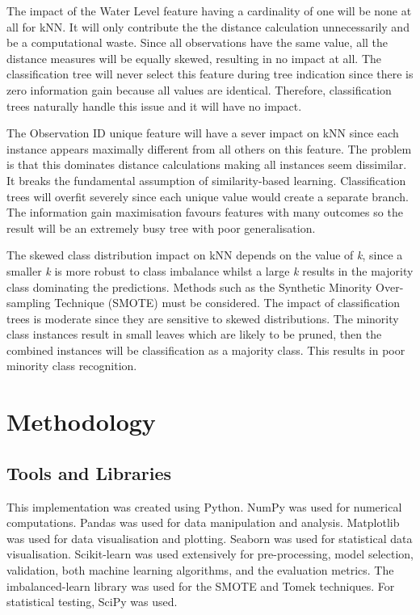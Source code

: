 \documentclass[10pt, conference]{IEEEtran}
\begin{document}
The impact of the Water Level feature having a cardinality of one will be none at all for kNN. It will only contribute the the distance calculation unnecessarily and be a computational waste. Since all observations have the same value, all the distance measures will be equally skewed, resulting in no impact at all. The classification tree will never select this feature during tree indication since there is zero information gain because all values are identical. Therefore, classification trees naturally handle this issue and it will have no impact.

The Observation ID unique feature will have a sever impact on kNN since each instance appears maximally different from all others on this feature. The problem is that this dominates distance calculations making all instances seem dissimilar. It breaks the fundamental assumption of similarity-based learning. Classification trees will overfit severely since each unique value would create a separate branch. The information gain maximisation favours features with many outcomes so the result will be an extremely busy tree with poor generalisation.

The skewed class distribution impact on kNN depends on the value of \textit{k}, since a smaller \textit{k} is more robust to class imbalance whilst a large \textit{k} results in the majority class dominating the predictions. Methods such as the Synthetic Minority Over-sampling Technique (SMOTE) must be considered. The impact of classification trees is moderate since they are sensitive to skewed distributions. The minority class instances result in small leaves which are likely to be pruned, then the combined instances will be classification as a majority class. This results in poor minority class recognition.

\section{Methodology}
\subsection{Tools and Libraries}
This implementation was created using Python. NumPy was used for numerical computations. Pandas was used for data manipulation and analysis. Matplotlib was used for data visualisation and plotting. Seaborn was used for statistical data visualisation. Scikit-learn was used extensively for pre-processing, model selection, validation, both machine learning algorithms, and the evaluation metrics. The imbalanced-learn library was used for the SMOTE and Tomek techniques. For statistical testing, SciPy was used.
\end{document}
